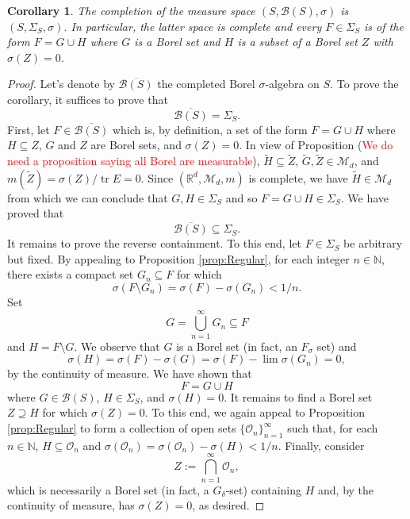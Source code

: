 \documentclass[11pt]{article}
\theoremstyle{theorem}
\newtheorem{corollary}[theorem]{Corollary}
\newcommand\tr{\operatorname{tr}}
\begin{document}
\begin{corollary}
The completion of the measure space $(S,\mathcal{B}(S),\sigma)$ is $(S,\Sigma_S,\sigma)$. In particular, the latter space is complete and every $F\in \Sigma_S$ is of the form $F=G\cup H$ where $G$ is a Borel set and $H$ is a subset of a Borel set $Z$ with $\sigma(Z)=0$.
\end{corollary}
\begin{proof}
Let's denote by $\overline{\mathcal{B}(S)}$ the completed Borel $\sigma$-algebra on $S$. To prove the corollary, it suffices to prove that
\begin{equation*}
\overline{\mathcal{B}(S)}=\Sigma_S.
\end{equation*}
First, let $F\in\overline{\mathcal{B}(S)}$ which is, by definition, a set of the form $F=G\cup H$ where $H\subseteq Z$, $G$ and $Z$ are Borel sets, and $\sigma(Z)=0$. In view of Proposition (\textcolor{red}{We do need a proposition saying all Borel are measurable}), $\widetilde{H}\subseteq\widetilde{Z}$, $\widetilde{G},\widetilde{Z}\in\mathcal{M}_d$, and $m(\widetilde{Z})=\sigma(Z)/\tr E=0$. Since $(\mathbb{R}^d,\mathcal{M}_d,m)$ is complete, we have $\widetilde{H}\in\mathcal{M}_d$ from which we can conclude that $G,H\in\Sigma_S$ and so $F=G\cup H\in\Sigma_S$. We have proved that
\begin{equation*}
\overline{\mathcal{B}(S)}\subseteq \Sigma_S.
\end{equation*}
It remains to prove the reverse containment. To this end, let $F\in\Sigma_S$ be arbitrary but fixed. By appealing to Proposition \ref{prop:Regular}, for each integer $n\in\mathbb{N}$, there exists a compact set $G_n\subseteq F$ for which
\begin{equation*}
\sigma(F\setminus G_n)=\sigma(F)-\sigma(G_n)<1/n.
\end{equation*}
Set
\begin{equation*}
G=\bigcup_{n=1}^\infty G_n\subseteq F
\end{equation*}
and $H=F\setminus G$. 
We observe that $G$ is a Borel set (in fact, an $F_\sigma$ set) and
\begin{equation*}
\sigma(H)=\sigma(F)-\sigma(G)=\sigma(F)-\lim\sigma(G_n)=0,
\end{equation*}
by the continuity of measure. We have shown that
\begin{equation*}
F=G\cup H
\end{equation*}
where $G\in\mathcal{B}(S)$, $H\in\Sigma_S$, and $\sigma(H)=0$. It remains to find a Borel set $Z\supseteq H$ for which $\sigma(Z)=0$. To this end, we again appeal to Proposition \ref{prop:Regular} to form a collection of open sets $\{\mathcal{O}_n\}_{n=1}^\infty$ such that, for each $n\in\mathbb{N}$, $H\subseteq \mathcal{O}_n$ and $\sigma(\mathcal{O}_n)=\sigma(\mathcal{O}_n)-\sigma(H)<1/n$. Finally, consider
\begin{equation*}
Z:=\bigcap_{n=1}^\infty\mathcal{O}_n,
\end{equation*}
which is necessarily a Borel set (in fact, a $G_\delta$-set) containing $H$ and, by the continuity of measure, has $\sigma(Z)=0$, as desired.
\end{proof}
\end{document}
